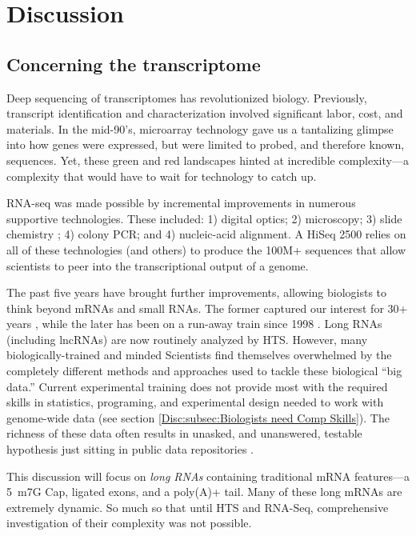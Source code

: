 \chapter{Discussion} 
\label{Disc}
\section{Concerning the transcriptome}
  \label{Disc:sec:Future of Dynamic long RNAs}

  Deep sequencing of transcriptomes has revolutionized biology. Previously, transcript identification and characterization involved significant labor, cost, and materials. In the mid-90's, microarray technology \citep{Schena1995a} gave us a tantalizing glimpse into how genes were expressed, but were limited to probed, and therefore known, sequences. Yet, these green and red landscapes hinted at incredible complexity---a complexity that would have to wait for technology to catch up.

  RNA-seq was made possible by incremental improvements in numerous supportive technologies. These included: 1) digital optics; 2) microscopy; 3) slide chemistry ; 4) colony PCR; and 4) nucleic-acid alignment. A HiSeq 2500 relies on all of these technologies (and others) to produce the 100M+ sequences that allow scientists to peer into the transcriptional output of a genome.

  The past five years have brought further improvements, allowing biologists to think beyond mRNAs and small RNAs. The former captured our interest for 30+ years \citep{Furuichi1975,Wei1975}, while the later has been on a run-away train since 1998 \citep{Fire1998}. Long RNAs (including lncRNAs) are now routinely analyzed by HTS. However, many biologically-trained and minded Scientists find themselves overwhelmed by the completely different methods and approaches used to tackle these biological ``big data.'' Current experimental training does not provide most with the required skills in statistics, programing, and experimental design needed to work with genome-wide data (see section \ref{Disc:subsec:Biologists need Comp Skills}). The richness of these data often results in unasked, and unanswered, testable hypothesis just sitting in public data repositories \citep{Plocik2013}.

  This discussion will focus on \textit{long RNAs} containing traditional mRNA features---a 5\textprime~m7G Cap, ligated exons, and a poly(A)+ tail. Many of these long mRNAs are extremely dynamic. So much so that until HTS and RNA-Seq, comprehensive investigation of their complexity was not possible.

